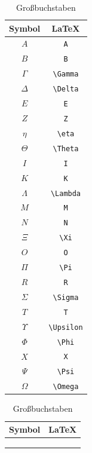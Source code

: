 \begin{table}[ht]
\begin{subtable}[b]{0.23\linewidth}
				\end{subtable}
				\begin{subtable}[b]{0.23\linewidth}
					\begin{tabular}{c|c}
						Symbol & \LaTeX\\\hline
						$A$ & \lstinline|A|\\
						$B$ & \lstinline|B|\\
						$\Gamma$ & \lstinline|\Gamma|\\
						$\Delta$ & \lstinline|\Delta|\\
						$E$ & \lstinline|E|\\
						$Z$ & \lstinline|Z|\\
						$\eta$ & \lstinline|\eta|\\
							$\Theta$ & \lstinline|\Theta|\\
							$I$ & \lstinline|I|\\
							$K$ & \lstinline|K|\\
							$\Lambda$ & \lstinline|\Lambda|\\
							$M$ & \lstinline|M|\\
							$N$ & \lstinline|N|\\
							$\Xi$ & \lstinline|\Xi|\\
							$O$ & \lstinline|O|\\
							$\Pi$ & \lstinline|\Pi|\\
							$R$ & \lstinline|R|\\
							$\Sigma$ & \lstinline|\Sigma|\\
							$T$ & \lstinline|T|\\
							$\Upsilon$ & \lstinline|\Upsilon|\\
							$\Phi$ & \lstinline|\Phi|\\
							$X$ & \lstinline|X|\\
						$\Psi$ & \lstinline|\Psi|\\
						$\Omega$ & \lstinline|\Omega|\\
					\end{tabular}
					\caption{Großbuchstaben}
				\end{subtable}
				\begin{subtable}[b]{0.265\linewidth}
					\begin{tabular}{c|c}
						Symbol & \LaTeX\\\hline
						&\\
						&\\
						&\\

\end{tabular}
\end{subtable}
\end{table}
